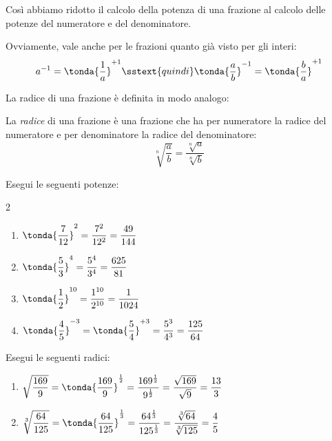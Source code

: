 Così abbiamo ridotto il calcolo della potenza di una frazione al calcolo 
delle potenze del numeratore e del denominatore.

\begin{osservazione}{}{}
Ovviamente, vale anche per le frazioni quanto già visto per gli interi: 
\[a^{-1} = \tonda{\dfrac{1}{a}}^{+1} \sstext{quindi} 
  \tonda{\dfrac{a}{b}}^{-1} = \tonda{\dfrac{b}{a}}^{+1}\]
\end{osservazione}

La radice di una frazione è definita in modo analogo:

\begin{definizione}{}{}
La \emph{radice} di una frazione è una frazione che ha per numeratore la 
radice del numeratore e per denominatore la radice del denominatore:
\[\sqrt[n]{\dfrac{a}{b}} = \dfrac{\sqrt[n]{a}}{\sqrt[n]{b}}\]
\end{definizione}

\begin{esempio}{}{}
Esegui le seguenti potenze:
\begin{htmulticols}{2}
\begin{enumerate} %
\item \(\tonda{\dfrac{7}{12}}^2 = \dfrac{7^2}{12^2} = \dfrac{49}{144}\)
\item \(\tonda{\dfrac{5}{3}}^4 = \dfrac{5^4}{3^4} = \dfrac{625}{81}\)
\item \(\tonda{\dfrac{1}{2}}^{10} = \dfrac{1^{10}}{2^{10}} = 
        \dfrac{1}{1024}\)
\item \(\tonda{\dfrac{4}{5}}^{-3} = \tonda{\dfrac{5}{4}}^{+3} = 
        \dfrac{5^3}{4^3} = \dfrac{125}{64}\)
\end{enumerate}
\end{htmulticols}
\end{esempio}

\begin{esempio}{}{}
Esegui le seguenti radici:
\begin{enumerate} %
\item 
\(\sqrt{\dfrac{169}{9}} = \tonda{\dfrac{169}{9}}^{\frac{1}{2}} =
  \dfrac{169^{\frac{1}{2}}}{9^{\frac{1}{2}}} = 
  \dfrac{\sqrt{169}}{\sqrt{9}} = 
  \dfrac{13}{3}\)
\item 
\(\sqrt[3]{\dfrac{64}{125}} = \tonda{\dfrac{64}{125}}^{\frac{1}{3}} =
  \dfrac{64^{\frac{1}{3}}}{125^{\frac{1}{3}}} = 
  \dfrac{\sqrt[3]{64}}{\sqrt[3]{125}} = \dfrac{4}{5}\)
\end{enumerate}
\end{esempio}

